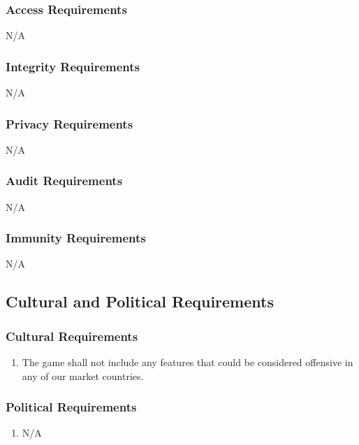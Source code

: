 \documentclass[12pt, titlepage]{article}
\begin{document}
\subsubsection{Access Requirements}
\label{ssub:access_requirements}
N/A

\subsubsection{Integrity Requirements}
\label{ssub:integrity_requirements}
N/A

\subsubsection{Privacy Requirements}
\label{ssub:privacy_requirements}
N/A

\subsubsection{Audit Requirements}
\label{ssub:audit_requirements}
N/A

\subsubsection{Immunity Requirements}
\label{ssub:immunity_requirements}
N/A


\subsection{Cultural and Political Requirements}
\label{sub:cultural_and_political_requirements}

\subsubsection{Cultural Requirements}
\label{ssub:cultural_requirements}
\begin{enumerate}[{CP}1. ]
	\item The game shall not include any features that could be considered offensive in any of our market countries.
\end{enumerate}

\subsubsection{Political Requirements}
\label{ssub:political_requirements}
\begin{enumerate}[]
	\item N/A
\end{enumerate}
\end{document}
